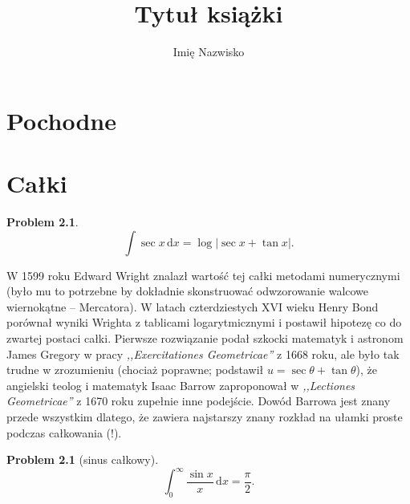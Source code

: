 \documentclass[9pt, twoside, a5paper, fleqn]{extbook}
\author{Imię Nazwisko}
\title{Tytuł książki}
\newcounter{counter}
\newtheorem{problem}[counter]{Problem}
\theoremstyle{remark}
\begin{document}






\raggedbottom

\chapter{Pochodne}


\chapter{Całki}





\begin{problem}
    \begin{equation}
        \int \sec x \,\mathrm{d} x = \log| \sec x + \tan x|.
    \end{equation}
\end{problem}

W 1599 roku Edward Wright znalazł wartość tej całki metodami numerycznymi (było mu to potrzebne by dokładnie skonstruować odwzorowanie walcowe wiernokątne -- Mercatora).
%
%
W latach czterdziestych XVI wieku Henry Bond porównał wyniki Wrighta z tablicami logarytmicznymi i postawił hipotezę co do zwartej postaci całki.
%
Pierwsze rozwiązanie podał szkocki matematyk i astronom James Gregory w pracy \emph{,,Exercitationes Geometricae''} z 1668 roku, ale było tak trudne w zrozumieniu (chociaż poprawne; podstawił $u = \sec \theta + \tan \theta$), że angielski teolog i matematyk Isaac Barrow zaproponował w \emph{,,Lectiones Geometricae''} z 1670 roku zupełnie inne podejście.
%
%
Dowód Barrowa jest znany przede wszystkim dlatego, że zawiera najstarszy znany rozkład na ułamki proste podczas całkowania (!).
%

\begin{problem}[sinus całkowy]
    \begin{equation}
        \int_0^\infty \frac {\sin x}{x} \,\mathrm{d} x = \frac \pi 2.
    \end{equation}
\end{problem}
\end{document}
